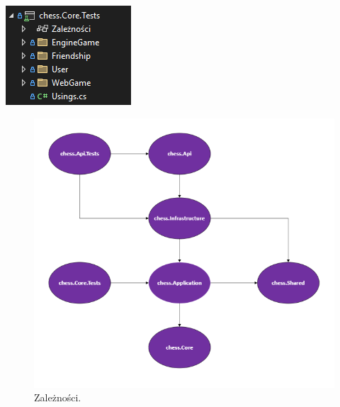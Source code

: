 \documentclass[12pt,a4paper]{article}
\begin{document}
\begin{minipage}[t]{0.45\textwidth}
    \vspace{0pt}
    \raggedright
    \lipsum[7] 
\end{minipage}
\hfill
\begin{minipage}[t]{0.45\textwidth}
    \vspace{0pt}
    \centering
    \includegraphics[width=\linewidth]{zdj/struktura_back_core_tests.png} 
\end{minipage}

\newpage

\begin{figure}[h!]
    \centering
    \includegraphics[width=1\textwidth]{zdj/backend_dependencies.png}
    \caption{Zależności.}
\end{figure}
\end{document}

